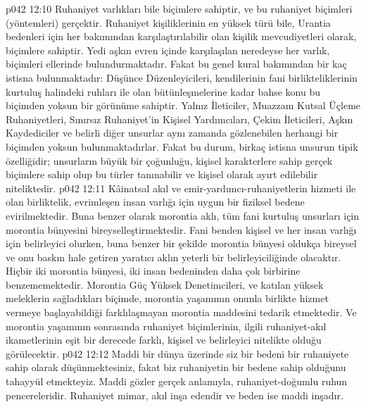 \vs p042 12:10 Ruhaniyet varlıkları bile biçimlere sahiptir, ve bu ruhaniyet biçimleri (yöntemleri) gerçektir. Ruhaniyet kişiliklerinin en yüksek türü bile, Urantia bedenleri için her bakımından karşılaştırılabilir olan kişilik mevcudiyetleri olarak, biçimlere sahiptir. Yedi aşkın evren içinde karşılaşılan neredeyse her varlık, biçimleri ellerinde bulundurmaktadır. Fakat bu genel kural bakımından bir kaç istisna bulunmaktadır: Düşünce Düzenleyicileri, kendilerinin fani birlikteliklerinin kurtuluş halindeki ruhları ile olan bütünleşmelerine kadar bahse konu bu biçimden yoksun bir görünüme sahiptir. Yalnız İleticiler, Muazzam Kutsal Üçleme Ruhaniyetleri, Sınırsız Ruhaniyet’in Kişisel Yardımcıları, Çekim İleticileri, Aşkın Kaydediciler ve belirli diğer unsurlar aynı zamanda gözlenebilen herhangi bir biçimden yoksun bulunmaktadırlar. Fakat bu durum, birkaç istisna unsurun tipik özelliğidir; unsurların büyük bir çoğunluğu, kişisel karakterlere sahip gerçek biçimlere sahip olup bu türler tanınabilir ve kişisel olarak ayırt edilebilir niteliktedir.
\vs p042 12:11 Kâinatsal akıl ve emir\hyp{}yardımcı\hyp{}ruhaniyetlerin hizmeti ile olan birliktelik, evrimleşen insan varlığı için uygun bir fiziksel bedene evirilmektedir. Buna benzer olarak morontia aklı, tüm fani kurtuluş unsurları için morontia bünyesini bireyselleştirmektedir. Fani benden kişisel ve her insan varlığı için belirleyici olurken, buna benzer bir şekilde morontia bünyesi oldukça bireysel ve onu baskın hale getiren yaratıcı aklın yeterli bir belirleyiciliğinde olacaktır. Hiçbir iki morontia bünyesi, iki insan bedeninden daha çok birbirine benzememektedir. Morontia Güç Yüksek Denetimcileri, ve katılan yüksek meleklerin sağladıkları biçimde, morontia yaşamının onunla birlikte hizmet vermeye başlayabildiği farklılaşmayan morontia maddesini tedarik etmektedir. Ve morontia yaşamının sonrasında ruhaniyet biçimlerinin, ilgili ruhaniyet\hyp{}akıl ikametlerinin eşit bir derecede farklı, kişisel ve belirleyici nitelikte olduğu görülecektir.
\vs p042 12:12 Maddi bir dünya üzerinde siz bir bedeni bir ruhaniyete sahip olarak düşünmektesiniz, fakat biz ruhaniyetin bir bedene sahip olduğunu tahayyül etmekteyiz. Maddi gözler gerçek anlamıyla, ruhaniyet\hyp{}doğumlu ruhun pencereleridir. Ruhaniyet mimar, akıl inşa edendir ve beden ise maddi inşadır.
